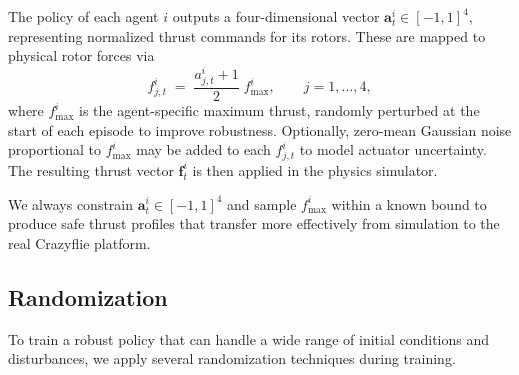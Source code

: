 The policy of each agent \(i\) outputs a four-dimensional vector \(\mathbf{a}^i_t\in[-1,1]^4\), representing normalized thrust commands for its rotors.  These are mapped to physical rotor forces via
\begin{equation}
f^i_{j,t}
\;=\;
\frac{a^i_{j,t} + 1}{2}\;f_{\max}^i,
\qquad
j=1,\dots,4,
\end{equation}
where \(f_{\max}^i\) is the agent-specific maximum thrust, randomly perturbed at the start of each episode to improve robustness.  Optionally, zero-mean Gaussian noise proportional to \(f_{\max}^i\) may be added to each \(f^i_{j,t}\) to model actuator uncertainty.  The resulting thrust vector \(\mathbf{f}^i_t\) is then applied in the physics simulator.  

We always constrain \(\mathbf{a}^i_t\in[-1,1]^4\) and sample \(f_{\max}^i\) within a known bound to produce safe thrust profiles that transfer more effectively from simulation to the real Crazyflie platform.
\subsection{Randomization}
To train a robust policy that can handle a wide range of initial conditions and disturbances, we apply several randomization techniques during training.
